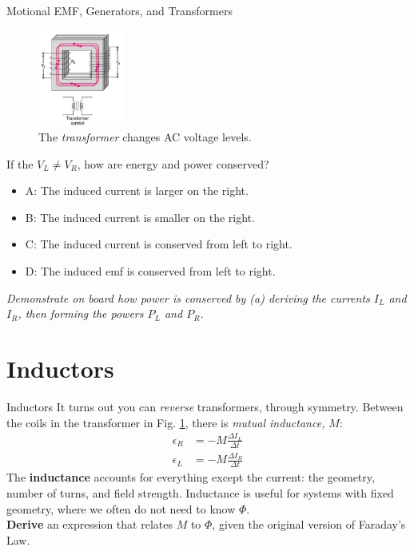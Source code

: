 \documentclass{beamer}
\begin{document}
\begin{frame}{Motional EMF, Generators, and Transformers}
\footnotesize
\begin{figure}
\centering
\includegraphics[width=0.25\textwidth,trim=0cm 5cm 0cm 0cm,clip=true]{figures/transformer.png}
\caption{\label{fig:trans4} \footnotesize The \textit{transformer} changes AC voltage levels.}
\end{figure}
If the $V_L \neq V_R$, how are energy and power conserved?
\begin{itemize}
\item A: The induced current is larger on the right.
\item B: The induced current is smaller on the right.
\item C: The induced current is conserved from left to right.
\item D: The induced emf is conserved from left to right.
\end{itemize}
\footnotesize
\textit{Demonstrate on board how power is conserved by (a) deriving the currents $I_L$ and $I_R$, then forming the powers $P_L$ and $P_R$.}
\end{frame}

\section{Inductors}

\begin{frame}{Inductors}
It turns out you can \textit{reverse} transformers, through symmetry.  Between the coils in the transformer in Fig. \ref{fig:trans4}, there is \textit{mutual inductance,} $M$:
\begin{align}
\epsilon_R &= -M \frac{\Delta I_L}{\Delta t} \\
\epsilon_L &= -M \frac{\Delta I_R}{\Delta t}
\end{align}
The \textbf{\alert{inductance}} accounts for everything except the current: the geometry, number of turns, and field strength.  Inductance is useful for systems with fixed geometry, where we often do not need to know $\Phi$. \\ \vspace{0.5cm}
\textbf{Derive} an expression that relates $M$ to $\Phi$, given the original version of Faraday's Law.
\end{frame}
\end{document}
